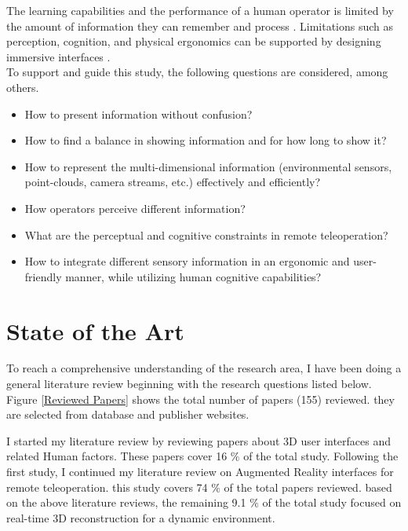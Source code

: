 The learning capabilities and the performance of a human operator is limited by the amount of information they can remember and process \cite{NAP25118}. Limitations such as perception, cognition, and physical ergonomics can be supported by designing immersive interfaces \cite{Bowman:2004:UIT:993837}.\\
To support and guide this study, the following questions are considered, among others.
\begin{itemize}
    \item How to present information without confusion?
    \item How to find a balance in showing information and for how long to show it?
    \item How to represent the multi-dimensional information (environmental sensors, point-clouds, camera streams, etc.) effectively and efficiently?
    \item How operators perceive different information?
    \item What are the perceptual and cognitive constraints in remote teleoperation?
    \item How to integrate different sensory information in an ergonomic and user-friendly manner, while utilizing human cognitive capabilities?
\end{itemize} 

\section{State of the Art}


To reach a comprehensive understanding of the research area, I have been doing a general literature review beginning with the research questions listed below. Figure \ref{Reviewed Papers} shows the total number of papers (155) reviewed. they are selected from database and publisher websites.

I started my literature review by reviewing papers about 3D user interfaces and related Human factors. These papers cover 16 $\%$ of the total study. Following the first study, I continued my literature review on  Augmented Reality interfaces for remote teleoperation. this study covers 74 $\%$ of the total papers reviewed. based on the above literature reviews, the remaining 9.1 $\%$ of the total study focused on real-time 3D reconstruction for a dynamic environment.

